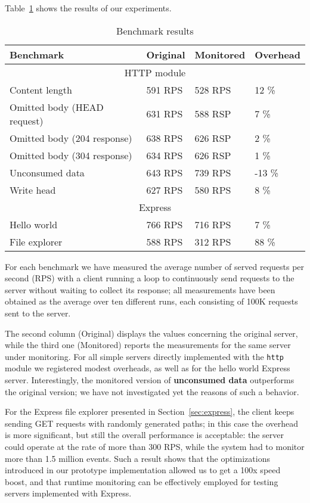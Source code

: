Table~\ref{table} shows the results of our experiments. 
\begin{table}[ht]
  \begin{tabular}{|l|l|l|l|}
    \hline
    \textbf{Benchmark} & 
    \textbf{Original} &
    \textbf{Monitored} &
    \textbf{Overhead} \\
    \hline
    \multicolumn{4}{|c|}{HTTP module}\\
    \hline
    Content length & 
    591 RPS &
    528 RPS &
    12 \% \\

    Omitted body (HEAD request)&
    631 RPS &
    588 RSP &
    7 \% \\

    Omitted body (204 response)&
    638 RPS &
    626 RSP &
    2 \% \\

    Omitted body (304 response)&
    634 RPS &
    626 RSP &
    1 \% \\

    Unconsumed data &
    643 RPS &
    739 RPS &
    -13 \% \\

    Write head &
    627 RPS &
    580 RPS &
    8 \% \\
    \hline

    \multicolumn{4}{|c|}{Express}\\
    \hline
    Hello world & 
    766 RPS &
    716 RPS &
    7 \% \\

    File explorer &
    588 RPS &
    312 RPS &
    88 \%\\

    \hline
  \end{tabular}
  \caption{Benchmark results}
  \label{table}
\end{table}
For each benchmark we have measured the average number of served requests per second (RPS) 
with a client running a loop to continuously send requests to the server without waiting to collect its response;
all measurements have been obtained as the average over ten different runs, each consisting
of 100K requests sent to the server.

The second column (Original) displays the values concerning the original server, while the third one
(Monitored) reports the measurements for the same server under monitoring.
For all simple servers directly implemented with the \lstinline{http} module we registered modest overheads, as well
as for the hello world Express server.
Interestingly, the monitored version of \textbf{unconsumed data} outperforms the original version; we have
not investigated yet the reasons of such a behavior.

For the Express file explorer presented in Section~\ref{sec:express}, the client keeps sending GET requests
with randomly generated paths; in this case the overhead is more significant, but still the overall performance 
is acceptable: the server could operate at the rate of more than 300 RPS, while the system had to monitor more than 1.5 million events.
Such a result shows that the optimizations introduced in our prototype implementation allowed us
to get a 100x speed boost, and that runtime monitoring can be effectively employed for testing servers implemented with Express.
